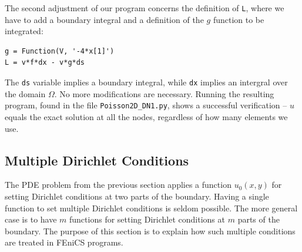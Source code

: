 The second adjustment of our program concerns the definition of {\fontsize{12pt}{12pt}\texttt{L}},
where we have to add a boundary integral and a definition of the $g$
function to be integrated:
\begin{Verbatim}[fontsize=\fontsize{10pt}{10pt},tabsize=8,baselinestretch=1.05,
fontfamily=tt,xleftmargin=7mm]
g = Function(V, '-4*x[1]')
L = v*f*dx - v*g*ds
\end{Verbatim}
\noindent
The {\fontsize{12pt}{12pt}\verb!ds!} variable implies a boundary integral, while {\fontsize{12pt}{12pt}\verb!dx!}
implies an intergral over the domain $\Omega$.
No more modifications are necessary. Running the resulting program,
found in the file {\fontsize{12pt}{12pt}\verb!Poisson2D_DN1.py!}, shows a
successful verification --
$u$ equals the exact solution at all the nodes, regardless of
how many elements we use.

\subsection{Multiple Dirichlet Conditions}
\label{langtangen:poisson:multiple:Dirichlet}

The PDE problem from the previous section applies a function $u_0(x,y)$
for setting Dirichlet conditions at two parts of the boundary.
Having a single function to set multiple Dirichlet conditions is
seldom possible. The more general case is to have $m$ functions for
setting Dirichlet conditions at $m$ parts of the boundary.
The purpose of this section is to explain how such multiple conditions
are treated in FEniCS programs.

